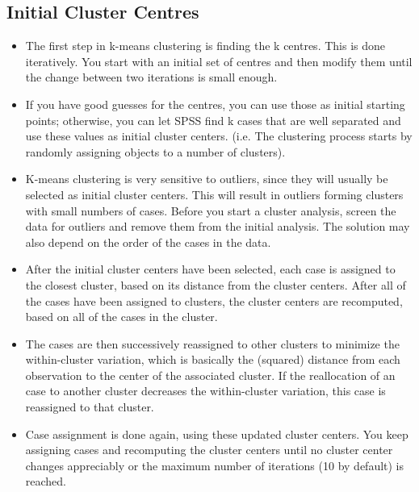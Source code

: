\documentclass[a4paper,12pt]{article}
\begin{document}
\subsection{Initial Cluster Centres}
\begin{itemize}
	\item The first step in k-means clustering is finding the k centres. This is done iteratively. You start with an initial set of centres and then modify them until the change between two iterations is small enough.
	
\item If you have good guesses for the centres, you can use those
	as initial starting points; otherwise, you can let SPSS find k cases that are well separated and use these values as initial cluster centers. (i.e. The clustering process starts by randomly assigning objects to a number of
	clusters).
\item K-means clustering is very sensitive to outliers, since they will usually be selected as initial cluster centers. This will result in outliers forming clusters with small numbers of cases. Before you start a cluster analysis, screen the data for outliers and remove them from the initial analysis. The solution may also depend on the order of the cases in the data.
	
\item After the initial cluster centers have been selected, each case is assigned to the closest
	cluster, based on its distance from the cluster centers. After all of the cases have been
	assigned to clusters, the cluster centers are recomputed, based on all of the cases in the
	cluster.
	
\item The cases are then successively reassigned to other clusters to minimize the within-cluster variation, which is basically the (squared) distance from each observation to the center of the associated cluster. If the reallocation of an case to another cluster decreases the within-cluster variation, this case is reassigned
	to that cluster.
	
\item Case assignment is done again, using these updated cluster centers. You keep
	assigning cases and recomputing the cluster centers until no cluster center changes
	appreciably or the maximum number of iterations (10 by default) is reached.
\end{itemize}
\end{document}
